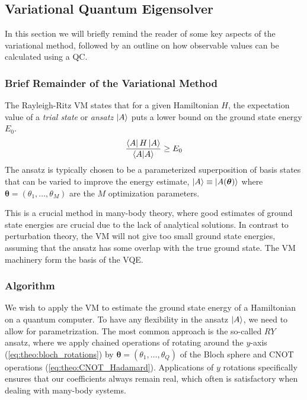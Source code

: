 \subsection{Variational Quantum Eigensolver}
In this section we will briefly remind the reader of some key aspects of the variational method, followed by an outline on how observable values can be calculated using a QC. 

\subsubsection{Brief Remainder of the Variational Method}
The Rayleigh-Ritz VM states that for a given Hamiltonian $H$, the expectation value of a \textit{trial state} or \textit{ansatz} $\ket{A}$ puts a lower bound on the ground state energy $E_0$.
\begin{equation}
    \frac{\bra{A}H\ket{A}}{\ip{A}} \geq E_0
\end{equation}
The ansatz is typically chosen to be a parameterized superposition of basis states that can be varied to improve the energy estimate, $\ket{A}\equiv \ket{A(\boldsymbol{\theta})}$ where $\boldsymbol{\theta} = (\theta_1, \ldots, \theta_M)$ are the $M$ optimization parameters.

This is a crucial method in many-body theory, where good estimates of ground state energies are crucial due to the lack of analytical solutions. In contrast to perturbation theory, the VM will not give too small ground state energies, assuming that the ansatz has some overlap with the true ground state. The VM machinery form the basis of the VQE. 

\subsubsection{Algorithm}
We wish to apply the VM to estimate the ground state energy of a Hamiltonian on a quantum computer. To have any flexibility in the ansatz $\ket{A}$, we need to allow for parametrization. The most common approach is the so-called $RY$ ansatz, where we apply chained operations of rotating around the $y$-axis (\cref{eq:theo:bloch_rotations}) by $\boldsymbol{\theta} = (\theta_1,\ldots,\theta_Q)$ of the Bloch sphere and CNOT operations (\cref{eq:theo:CNOT_Hadamard}). Applications of $y$ rotations specifically ensures that our coefficients always remain real, which often is satisfactory when dealing with many-body systems. 

